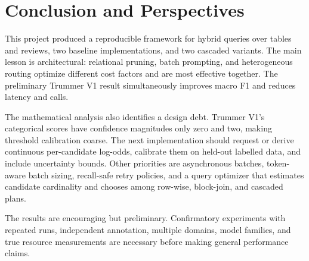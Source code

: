 \chapter{Conclusion and Perspectives}
This project produced a reproducible framework for hybrid queries over tables and
reviews, two baseline implementations, and two cascaded variants. The main lesson
is architectural: relational pruning, batch prompting, and heterogeneous routing
optimize different cost factors and are most effective together. The preliminary
Trummer V1 result simultaneously improves macro F1 and reduces latency and calls.

The mathematical analysis also identifies a design debt. Trummer V1's categorical
scores have confidence magnitudes only zero and two, making threshold calibration
coarse. The next implementation should request or derive continuous per-candidate
log-odds, calibrate them on held-out labelled data, and include uncertainty bounds.
Other priorities are asynchronous batches, token-aware batch sizing, recall-safe
retry policies, and a query optimizer that estimates candidate cardinality and
chooses among row-wise, block-join, and cascaded plans.

The results are encouraging but preliminary. Confirmatory experiments with repeated
runs, independent annotation, multiple domains, model families, and true resource
measurements are necessary before making general performance claims.
